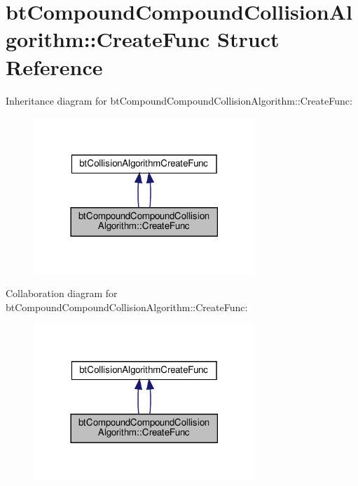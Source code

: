 \hypertarget{structbtCompoundCompoundCollisionAlgorithm_1_1CreateFunc}{}\section{bt\+Compound\+Compound\+Collision\+Algorithm\+:\+:Create\+Func Struct Reference}
\label{structbtCompoundCompoundCollisionAlgorithm_1_1CreateFunc}


Inheritance diagram for bt\+Compound\+Compound\+Collision\+Algorithm\+:\+:Create\+Func\+:
\nopagebreak
\begin{figure}[H]
\begin{center}
\leavevmode
\includegraphics[width=237pt]{structbtCompoundCompoundCollisionAlgorithm_1_1CreateFunc__inherit__graph}
\end{center}
\end{figure}


Collaboration diagram for bt\+Compound\+Compound\+Collision\+Algorithm\+:\+:Create\+Func\+:
\nopagebreak
\begin{figure}[H]
\begin{center}
\leavevmode
\includegraphics[width=237pt]{structbtCompoundCompoundCollisionAlgorithm_1_1CreateFunc__coll__graph}
\end{center}
\end{figure}
